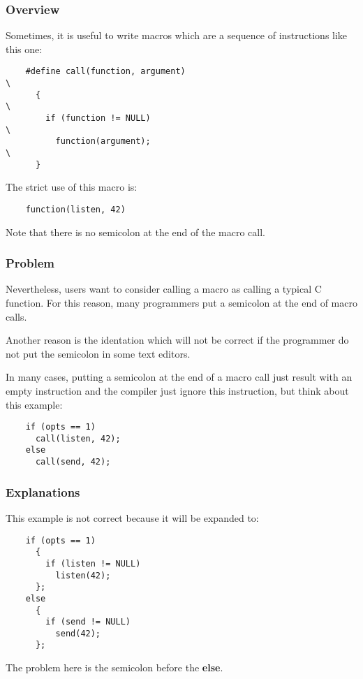 \documentclass[9pt]{beamer}
\newcommand{\nl}[0]{\vspace{0.4cm}}
\begin{document}
\begin{frame}[containsverbatim]
  \frametitle{Overview}

  Sometimes, it is useful to write macros which are a sequence of
  instructions like this one:

  \begin{verbatim}
    #define call(function, argument)                                    \
      {                                                                 \
        if (function != NULL)                                           \
          function(argument);                                           \
      }
  \end{verbatim}

  The strict use of this macro is:

  \begin{verbatim}
    function(listen, 42)
  \end{verbatim}

  Note that there is no semicolon at the end of the macro call.
\end{frame}


\begin{frame}[containsverbatim]
  \frametitle{Problem}

  Nevertheless, users want to consider calling a macro as calling a
  typical C function. For this reason, many programmers put a semicolon
  at the end of macro calls.

  \nl

  Another reason is the identation which will not be correct if the
  programmer do not put the semicolon in some text editors.

  \nl

  In many cases, putting a semicolon at the end of a macro call
  just result with an empty instruction and the compiler just ignore
  this instruction, but think about this example:

  \begin{verbatim}
    if (opts == 1)
      call(listen, 42);
    else
      call(send, 42);
  \end{verbatim}
\end{frame}


\begin{frame}[containsverbatim]
  \frametitle{Explanations}

  This example is not correct because it will be expanded to:

  \begin{verbatim}
    if (opts == 1)
      {
        if (listen != NULL)
          listen(42);
      };
    else
      {
        if (send != NULL)
          send(42);
      };
  \end{verbatim}

  The problem here is the semicolon before the \textbf{else}.
\end{frame}
\end{document}
